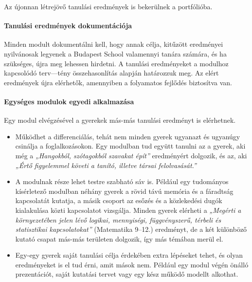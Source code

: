 Az újonnan létrejövő tanulási eredmények is bekerülnek a portfólióba.

\hypertarget{tanulasi-eredmenyek-dokumentacioja}{%
\paragraph{Tanulási eredmények
dokumentációja}\label{tanulasi-eredmenyek-dokumentacioja}}

Minden modult dokumentálni\break
kell, hogy annak célja, kitűzött eredményei
nyilvánosak legyenek a Budapest School valamennyi tanára számára, és ha
szükséges, újra meg lehessen hirdetni. A tanulási eredményeket a
modulhoz kapcsolódó terv---tény összehasonlítás alapján határozzuk
meg. Az elért eredmények újra elérhetők, amennyiben a
folyamatos fejlődés biztosítva van.

\hypertarget{egyseges-modulok-egyedi-alkalmazasa}{%
\paragraph{Egységes modulok egyedi
alkalmazása}\label{egyseges-modulok-egyedi-alkalmazasa}}

Egy modul elvégzésével a gyerekek más-más tanulási eredményt is elérhetnek.

\begin{itemize}
\item
  Működhet a differenciálás, tehát nem minden gyerek ugyanazt és
  ugyanúgy csinálja a foglalkozásokon. Egy modulban tud együtt tanulni
  az a gyerek, aki még a \emph{„Hangokból, szótagokból szavakat épít''}
  eredményért dolgozik, és az, aki \emph{„Értő figyelemmel követi a
  tanító, illetve társai felolvasását.''}
\item
  A modulnak része lehet testre szabható sáv is. Például egy tudományos
  kísérletező modulban néhány gyerek a rövid távú memória és a fáradtság
  kapcsolatát kutatja, a másik csoport az esőzés és a közlekedési dugók
  kialakulása közti kapcsolatot vizsgálja. Minden gyerek elérheti a
  \emph{„Megérti a környezetében jelen lévő logikai, mennyiségi,
  függvényszerű, térbeli és statisztikai kapcsolatokat''} (Matematika 9--12.) eredményt, de a két különböző kutató csapat más-más
  területen dolgozik, így más témában merül el.
\item
  Egy-egy gyerek saját tanulási célja érdekében extra lépéseket tehet,
  és olyan eredményeket is el tud érni, amit mások nem. Például egy
  modul végén önálló prezentációt, saját kutatási tervet vagy egy kész
  működő modellt alkothat.
\end{itemize}

